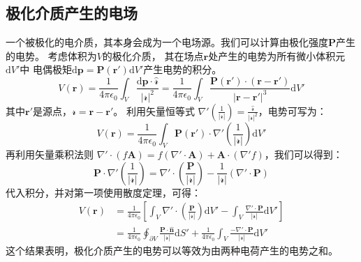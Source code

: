 \documentclass[fontset=none]{ctexart}
\begin{document}
\subsection{极化介质产生的电场}
一个被极化的电介质，其本身会成为一个电场源。我们可以计算由极化强度$\bm{P}$产生的电势。
考虑体积为$V$的极化介质，
其在场点$\bm{r}$处产生的电势为所有微小体积元$\mathrm{d}V'$中
电偶极矩$\mathrm{d}\bm{p} = \bm{P}(\bm{r}')\mathrm{d}V'$产生电势的积分。
\begin{equation}
    V(\bm{r}) = \frac{1}{4\pi\epsilon_0} \int_V \frac{\mathrm{d}\bm{p} 
    \cdot \hat{\bm{\mathscr{r}}}}{|\bm{\mathscr{r}}|^2} 
    = \frac{1}{4\pi\epsilon_0} \int_V \frac{\bm{P}(\bm{r}') 
    \cdot (\bm{r}-\bm{r}')}{|\bm{r}-\bm{r}'|^3} \mathrm{d}V'
\end{equation}
其中$\bm{r}'$是源点，$\bm{\mathscr{r}} = \bm{r}-\bm{r}'$。
利用矢量恒等式 $\nabla' \left(\frac{1}{|\bm{\mathscr{r}}|}\right) 
= \frac{\hat{\bm{\mathscr{r}}}}{|\bm{\mathscr{r}}|^2}$，电势可写为：
\begin{equation}
    V(\bm{r}) = \frac{1}{4\pi\epsilon_0} \int_V \bm{P}(\bm{r}') 
    \cdot \nabla' \left( \frac{1}{|\bm{\mathscr{r}}|} \right) \mathrm{d}V'
\end{equation}
再利用矢量乘积法则 $\nabla' \cdot (f\bm{A}) = f(\nabla' \cdot \bm{A}) 
+ \bm{A} \cdot (\nabla' f)$，我们可以得到：
\begin{equation}
    \bm{P} \cdot \nabla' \left( \frac{1}{|\bm{\mathscr{r}}|} \right) 
    = \nabla' \cdot \left( \frac{\bm{P}}{|\bm{\mathscr{r}}|} \right) 
    - \frac{1}{|\bm{\mathscr{r}}|} (\nabla' \cdot \bm{P})
\end{equation}
代入积分，并对第一项使用散度定理，可得：
\begin{equation}
\begin{aligned}
    V(\bm{r}) &= \frac{1}{4\pi\epsilon_0} \left[ \int_V \nabla' \cdot 
    \left( \frac{\bm{P}}{|\bm{\mathscr{r}}|} \right) \mathrm{d}V' 
    - \int_V \frac{\nabla' \cdot \bm{P}}{|\bm{\mathscr{r}}|} \mathrm{d}V' \right] \\
    &= \frac{1}{4\pi\epsilon_0} \oint_{\partial V} \frac{\bm{P} \cdot 
    \hat{\bm{n}}}{|\bm{\mathscr{r}}|} \mathrm{d}S' + \frac{1}{4\pi\epsilon_0} 
    \int_V \frac{-\nabla' \cdot \bm{P}}{|\bm{\mathscr{r}}|} \mathrm{d}V'
\end{aligned}
\end{equation}
这个结果表明，极化介质产生的电势可以等效为由两种电荷产生的电势之和。
\end{document}
